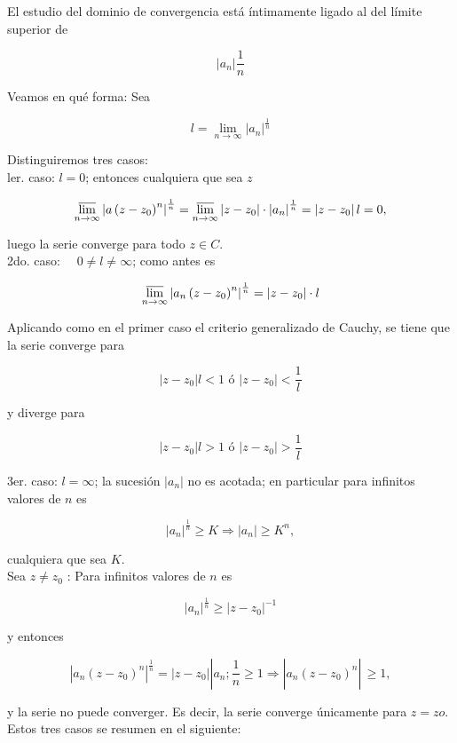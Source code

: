 \documentclass[10pt]{article}
\theoremstyle{plain}
\theoremstyle{definition}
\theoremstyle{remark}
\begin{document}
El estudio del dominio de convergencia está íntimamente ligado al del límite superior de

$$
\left|a_{n}\right| \frac{1}{n}
$$

Veamos en qué forma: Sea

$$
l=\lim _{n \rightarrow \infty}\left|a_{n}\right|^{\frac{1}{n}}
$$

Distinguiremos tres casos:\\
ler. caso: $l=0$; entonces cualquiera que sea $z$

$$
\varlimsup_{n \rightarrow \infty}\left|a\left(z-z_{0}\right)^{n}\right|^{\frac{1}{n}}=\varlimsup_{n \rightarrow \infty}\left|z-z_{0}\right| \cdot\left|a_{n}\right|^{\frac{1}{n}}=\left|z-z_{0}\right| l=0,
$$

luego la serie converge para todo $z \in C$.\\
2do. caso: $\quad 0 \neq l \neq \infty$; como antes es

$$
\varlimsup_{n \rightarrow \infty}\left|a_{n}\left(z-z_{0}\right)^{n}\right|^{\frac{1}{n}}=\left|z-z_{0}\right| \cdot l
$$

Aplicando como en el primer caso el criterio generalizado de Cauchy, se tiene que la serie converge para

$$
\left|z-z_{0}\right| l<1 \text { ó }\left|z-z_{0}\right|<\frac{1}{l}
$$

y diverge para

$$
\left|z-z_{0}\right| l>1 \text { ó }\left|z-z_{0}\right|>\frac{1}{l}
$$

3er. caso: $l=\infty$; la sucesión $\left|a_{n}\right|$ no es acotada; en particular para infinitos valores de $n$ es

$$
\left|a_{n}\right|^{\frac{1}{n}} \geqslant K \Rightarrow\left|a_{n}\right| \geqslant K^{n},
$$

cualquiera que sea $K$.\\
Sea $z \neq z_{0}$ : Para infinitos valores de $n$ es

$$
\left|a_{n}\right|^{\frac{1}{n}} \geqslant\left|z-z_{0}\right|^{-1}
$$

y entonces

$$
\left.\left|a_{n}\left(z-z_{0}\right)^{n}\right|^{\frac{1}{n}}=\left|z-z_{0}\right|\left|a_{n} ; \frac{1}{n} \geqslant 1 \Rightarrow\right| a_{n}\left(z-z_{0}\right)^{n} \right\rvert\, \geqslant 1,
$$

y la serie no puede converger.
Es decir, la serie converge únicamente para $z=z o$.
Estos tres casos se resumen en el siguiente:
\end{document}
